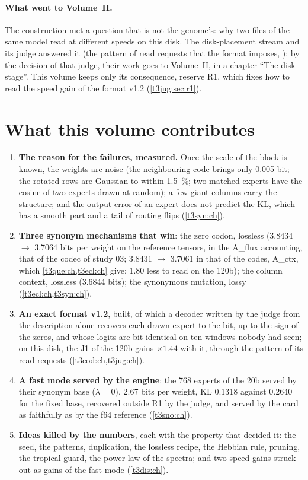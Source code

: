 \paragraph{What went to Volume~II.} The construction met a question that is not the genome's: why two files of the same model read at different speeds on this disk. The disk-placement stream and its judge answered it (the pattern of read requests that the format imposes, ); by the decision of that judge, their work goes to Volume~II, in a chapter ``The disk stage''. This volume keeps only its consequence, reserve R1, which fixes how to read the speed gain of the format v1.2 (\cref{t3jug:sec:r1}).

\section{What this volume contributes}\label{t3int:sec:apports}

\begin{enumerate}
\item \textbf{The reason for the failures, measured.} Once the scale of the block is known, the weights are noise (the neighbouring code brings only \num{0.005} bit; the rotated rows are Gaussian to within \SI{1.5}{\percent}; two matched experts have the cosine of two experts drawn at random); a few giant columns carry the structure; and the output error of an expert does not predict the KL, which has a smooth part and a tail of routing flips (\cref{t3syn:ch}).
\item \textbf{Three synonym mechanisms that win}: the zero codon, lossless (\num{3.8434} $\to$ \num{3.7064} bits per weight on the reference tensors, in the A\_flux accounting, that of the codec of study 03; \num{3.8431} $\to$ \num{3.7061} in that of the codes, A\_ctx, which \cref{t3que:ch,t3ecl:ch} give; \SI{1.80}{\Go} less to read on the 120b); the column context, lossless (\num{3.6844} bits); the synonymous mutation, lossy (\cref{t3ecl:ch,t3syn:ch}).
\item \textbf{An exact format v1.2}, built, of which a decoder written by the judge from the description alone recovers each drawn expert to the bit, up to the sign of the zeros, and whose logits are bit-identical on ten windows nobody had seen; on this disk, the J1 of the 120b gains $\times 1.44$ with it, through the pattern of its read requests (\cref{t3cod:ch,t3jug:ch}).
\item \textbf{A fast mode served by the engine}: the 768 experts of the 20b served by their synonym base ($\lambda = 0$), \num{2.67} bits per weight, KL \num{0.1318} against \num{0.2640} for the fixed base, recovered outside R1 by the judge, and served by the card as faithfully as by the f64 reference (\cref{t3sno:ch}).
\item \textbf{Ideas killed by the numbers}, each with the property that decided it: the seed, the patterns, duplication, the lossless recipe, the Hebbian rule, pruning, the tropical guard, the power law of the spectra; and two speed gains struck out as gains of the fast mode (\cref{t3dis:ch}).
\end{enumerate}

